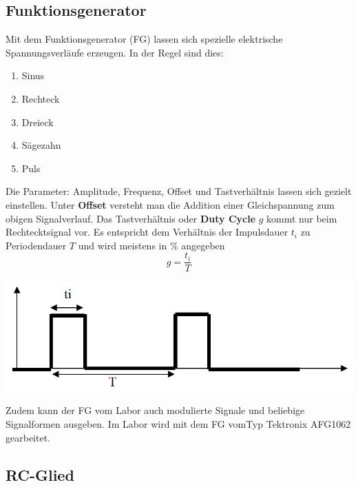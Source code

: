 \subsection{Funktionsgenerator}
Mit dem Funktionsgenerator (FG) lassen sich spezielle elektrische Spannungsverläufe erzeugen. In der Regel sind dies:
\begin{enumerate}[$a)$]
\item Sinus
\item Rechteck
\item Dreieck
\item Sägezahn
\item Puls
\end{enumerate}
Die Parameter: Amplitude, Frequenz, Offset und Tastverhältnis lassen sich gezielt einstellen. Unter \textbf{Offset} versteht man die Addition einer Gleichspannung zum obigen Signalverlauf. Das Tastverhältnis oder \textbf{Duty Cycle} $g$ kommt nur beim Rechtecktsignal vor. Es entspricht dem Verhältnis der Impulsdauer $t_i$ zu Periodendauer $T$ und wird meistens in \% angegeben
\begin{equation}
\boxed{g=\dfrac{t_i}{T}}
\end{equation}
\begin{center}
\includegraphics[scale=0.5]{../img/IV/IVd}
\end{center}
Zudem kann der FG vom Labor auch modulierte Signale und beliebige Signalformen ausgeben. Im Labor wird mit dem FG vomTyp Tektronix AFG1062 gearbeitet.
\subsection{RC-Glied}
